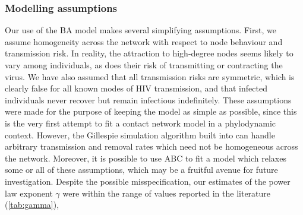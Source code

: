\subsubsection{Modelling assumptions}

Our use of the \gls{BA} model makes several simplifying assumptions. First, we
assume homogeneity across the network with respect to node behaviour and
transmission risk. In reality, the attraction to high-degree nodes seems likely
to vary among individuals, as does their risk of transmitting or contracting
the virus. We have also assumed that all transmission risks are symmetric,
which is clearly false for all known modes of \gls{HIV} transmission, and that
infected individuals never recover but remain infectious indefinitely. These
assumptions were made for the purpose of keeping the model as simple as
possible, since this is the very first attempt to fit a contact network model
in a phylodynamic context. However, the Gillespie simulation algorithm built
into  can handle arbitrary transmission and removal rates
which need not be homogeneous across the network. Moreover, it is possible to
use \gls{ABC} to fit a model which relaxes some or all of these assumptions,
which may be a fruitful avenue for future investigation.  Despite the possible
misspecification, our estimates of the power law exponent $\gamma$ were within
the range of values reported in the literature (\cref{tab:gamma}), 
